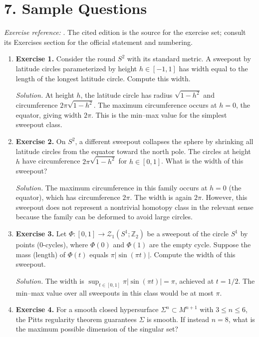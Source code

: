 \section*{7. Sample Questions}
\emph{Exercise reference:} \cite{almgren_pitts_min_max_theory_ref1}. The cited edition is the source for the exercise set; consult its Exercises section for the official statement and numbering.
\begin{enumerate}[leftmargin=*,itemsep=0.9em]

\item \textbf{Exercise 1.} Consider the round $S^2$ with its standard metric. A sweepout by latitude circles parameterized by height $h\in[-1,1]$ has width equal to the length of the longest latitude circle. Compute this width.

\emph{Solution.} At height $h$, the latitude circle has radius $\sqrt{1-h^2}$ and circumference $2\pi\sqrt{1-h^2}$. The maximum circumference occurs at $h=0$, the equator, giving width $2\pi$. This is the min--max value for the simplest sweepout class.

\item \textbf{Exercise 2.} On $S^2$, a different sweepout collapses the sphere by shrinking all latitude circles from the equator toward the north pole. The circles at height $h$ have circumference $2\pi\sqrt{1-h^2}$ for $h\in[0,1]$. What is the width of this sweepout?

\emph{Solution.} The maximum circumference in this family occurs at $h=0$ (the equator), which has circumference $2\pi$. The width is again $2\pi$. However, this sweepout does not represent a nontrivial homotopy class in the relevant sense because the family can be deformed to avoid large circles.

\item \textbf{Exercise 3.} Let $\Phi:[0,1]\to\mathcal{Z}_1(S^1;\mathbb{Z}_2)$ be a sweepout of the circle $S^1$ by points (0-cycles), where $\Phi(0)$ and $\Phi(1)$ are the empty cycle. Suppose the mass (length) of $\Phi(t)$ equals $\pi|\sin(\pi t)|$. Compute the width of this sweepout.

\emph{Solution.} The width is $\sup_{t\in[0,1]}\pi|\sin(\pi t)|=\pi$, achieved at $t=1/2$. The min--max value over all sweepouts in this class would be at most $\pi$.

\item \textbf{Exercise 4.} For a smooth closed hypersurface $\Sigma^n\subset M^{n+1}$ with $3\le n\le 6$, the Pitts regularity theorem guarantees $\Sigma$ is smooth. If instead $n=8$, what is the maximum possible dimension of the singular set?


\end{enumerate}
